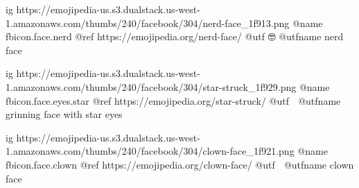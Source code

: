 	ig https://emojipedia-us.s3.dualstack.us-west-1.amazonaws.com/thumbs/240/facebook/304/nerd-face_1f913.png
	@name fbicon.face.nerd
	@ref https://emojipedia.org/nerd-face/
	@utf 🤓
	@utfname nerd face

	ig https://emojipedia-us.s3.dualstack.us-west-1.amazonaws.com/thumbs/240/facebook/304/star-struck_1f929.png
	@name fbicon.face.eyes.star
	@ref https://emojipedia.org/star-struck/
	@utf 🤩
	@utfname grinning face with star eyes

	ig https://emojipedia-us.s3.dualstack.us-west-1.amazonaws.com/thumbs/240/facebook/304/clown-face_1f921.png
	@name fbicon.face.clown
	@ref https://emojipedia.org/clown-face/
	@utf 🤡
	@utfname clown face

\fi
